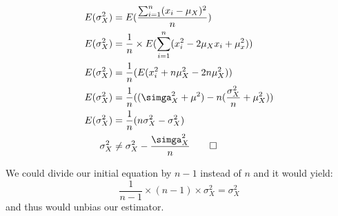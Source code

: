 \documentclass[12pt,twoside]{article}
\begin{document}
\begin{enumerate}
\begin{equation}
    \begin{split}
        E(\sigma_{X}^2) &= E(\frac{ \sum_{i=1}^{n}  (x_i - \mu_X)^2}{n}) \\
        E(\sigma_{X}^2) &= \frac{1}{n} \times E(\sum_{i=1}^n (x_i^2-2\mu_Xx_i + \mu_x^2))\\
        E(\sigma_{X}^2) &= \frac{1}{n}(E(x_i^2 + n\mu_X^2 - 2n\mu_X^2))\\
         E(\sigma_{X}^2) &= \frac{1}{n}((\simga_X^2 + \mu^2)-n(\frac{\sigma_X^2}{n}+\mu_X^2)) \\
         E(\sigma_{X}^2) &=\frac{1}{n}(n\sigma_X^2 - \sigma_X^2)\\
         \sigma_X^2 &\neq \sigma_X^2 - \frac{\simga_X^2}{n} \qed
    \end{split}
\end{equation}

We could divide our initial equation by $n-1$ instead of $n$ and it would yield: $$
    \frac{1}{n-1} \times (n-1) \times \sigma_X^2 = \sigma_X^2
$$
and thus would unbias our estimator.


\end{enumerate}
\end{document}
